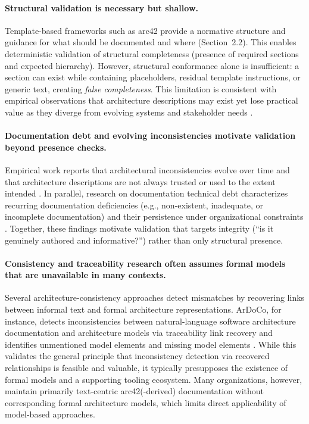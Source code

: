 \paragraph{Structural validation is necessary but shallow.}
Template-based frameworks such as arc42 provide a normative structure and guidance for what should be documented and where (Section~2.2). This enables deterministic validation of structural completeness (presence of required sections and expected hierarchy). However, structural conformance alone is insufficient: a section can exist while containing placeholders, residual template instructions, or generic text, creating \emph{false completeness}. This limitation is consistent with empirical observations that architecture descriptions may exist yet lose practical value as they diverge from evolving systems and stakeholder needs \cite{wohlrab_icsa19_guidelines}.

\paragraph{Documentation debt and evolving inconsistencies motivate validation beyond presence checks.}
Empirical work reports that architectural inconsistencies evolve over time and that architecture descriptions are not always trusted or used to the extent intended \cite{wohlrab_icsa19_guidelines}. In parallel, research on documentation technical debt characterizes recurring documentation deficiencies (e.g., non-existent, inadequate, or incomplete documentation) and their persistence under organizational constraints \cite{mendes_doc_td}. Together, these findings motivate validation that targets integrity (``is it genuinely authored and informative?'') rather than only structural presence.

\paragraph{Consistency and traceability research often assumes formal models that are unavailable in many contexts.}
Several architecture-consistency approaches detect mismatches by recovering links between informal text and formal architecture representations. ArDoCo, for instance, detects inconsistencies between natural-language software architecture documentation and architecture models via traceability link recovery and identifies unmentioned model elements and missing model elements \cite{ardoco_icsa23}. While this validates the general principle that inconsistency detection via recovered relationships is feasible and valuable, it typically presupposes the existence of formal models and a supporting tooling ecosystem. Many organizations, however, maintain primarily text-centric arc42(-derived) documentation without corresponding formal architecture models, which limits direct applicability of model-based approaches.

